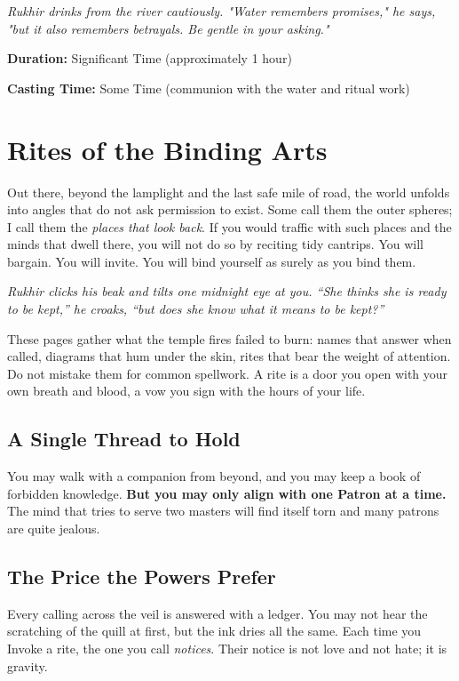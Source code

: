 \documentclass[12pt,twoside]{book}
\newcommand{\shadow}[1]{\textit{#1}}
\begin{document}
\shadow{Rukhir drinks from the river cautiously. "Water remembers promises," he says, "but it also remembers betrayals. Be gentle in your asking."}

\textbf{Duration:} Significant Time (approximately 1 hour)

\textbf{Casting Time:} Some Time (communion with the water and ritual work)

\chapter{Rites of the Binding Arts}
\label{chap:outer-rites}

\lettrine[lines=3]{O}{}ut there, beyond the lamplight and the last safe mile of road, the world unfolds into angles that do not ask permission to exist. Some call them the outer spheres; I call them the \emph{places that look back}. If you would traffic with such places and the minds that dwell there, you will not do so by reciting tidy cantrips. You will bargain. You will invite. You will bind yourself as surely as you bind them.

\shadow{Rukhir clicks his beak and tilts one midnight eye at you. ``She thinks she is ready to be \emph{kept},'' he croaks, ``but does she know what it means to be \emph{kept}?''}

These pages gather what the temple fires failed to burn: names that answer when called, diagrams that hum under the skin, rites that bear the weight of attention. Do not mistake them for common spellwork. A rite is a door you open with your own breath and blood, a vow you sign with the hours of your life.

\section*{A Single Thread to Hold}
You may walk with a companion from beyond, and you may keep a book of forbidden knowledge. \textbf{But you may only align with one Patron at a time.} The mind that tries to serve two masters will find itself torn and many patrons are quite jealous.

\section*{The Price the Powers Prefer}
Every calling across the veil is answered with a ledger. You may not hear the scratching of the quill at first, but the ink dries all the same. Each time you Invoke a rite, the one you call \emph{notices}. Their notice is not love and not hate; it is gravity.
\end{document}
